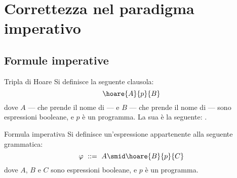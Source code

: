 \documentclass[a4paper, 12pt]{report}
\begin{document}
    \section{Correttezza nel paradigma imperativo}

    \subsection{Formule imperative}

    \begin{frameddefn}{Tripla di Hoare}
        Si definisce  la seguente clausola: $$\hoare{A}{p}{B}$$ dove $A$ --- che prende il nome di  --- e $B$ --- che prende il nome di  --- sono espressioni booleane, e $p$ è un programma. La sua  è la seguente: .
    \end{frameddefn}

    \begin{frameddefn}[label={imp formula}]{Formula imperativa}
        Si definisce  un'espressione appartenente alla seguente grammatica: $$\varphi \ ::= \ A \smid \hoare{B}{p}{C}$$ dove $A$, $B$ e $C$ sono espressioni booleane, e $p$ è un programma.
    \end{frameddefn}
\end{document}
